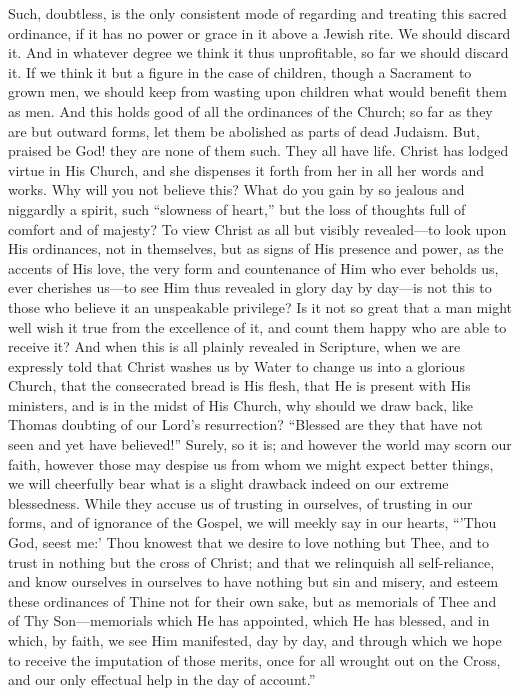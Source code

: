 Such, doubtless, is the only consistent mode of regarding and
treating this sacred ordinance, if it has no power or grace in it
above a Jewish rite. We should discard it. And in whatever degree we
think it thus unprofitable, so far we should discard it. If we think
it but a figure in the case of children, though a Sacrament to grown
men, we should keep from wasting upon children what would benefit them
as men. And this holds good of all the ordinances of the Church; so
far as they are but outward forms, let them be abolished as parts of
dead Judaism. But, praised be God! they are none of them such. They
all have life. Christ has lodged virtue in His Church, and she
dispenses it forth from her in all her words and works. Why will you
not believe this? What do you gain by so jealous and niggardly a
spirit, such ``slowness of heart,'' but the loss of thoughts
full of comfort and of majesty? To view Christ as all but visibly
revealed—to look upon His ordinances, not in themselves, but as
signs of His presence and power, as the accents of His love, the very
form and countenance of Him who ever beholds us, ever cherishes us—to
see Him thus revealed in glory day by day—is not this to those who
believe it an unspeakable privilege? Is it not so great that a man
might well wish it true from the excellence of it, and count them
happy who are able to receive it? And when this is all plainly
revealed in Scripture, when we are expressly told that Christ washes
us by Water to change us into a glorious Church, that the consecrated
bread is His flesh, that He is present with His ministers, and is in
the midst of His Church, why should we draw back, like Thomas doubting
of our Lord's resurrection? ``Blessed are they that have not
seen and yet have believed!'' Surely, so it is; and however the
world may scorn our faith, however those may despise us from whom we
might expect better things, we will cheerfully bear what is a slight
drawback indeed on our extreme blessedness. While they accuse us of
trusting in ourselves, of trusting in our forms, and of ignorance of
the Gospel, we will meekly say in our hearts, ``'Thou God, seest
me:' Thou knowest that we desire to love nothing but Thee, and to
trust in nothing but the cross of Christ; and that we relinquish all
self-reliance, and know ourselves in ourselves to have nothing but sin
and misery, and esteem these ordinances of Thine not for their own
sake, but as memorials of Thee and of Thy Son—memorials which He has
appointed, which He has blessed, and in which, by faith, we see Him
manifested, day by day, and through which we hope to receive the
imputation of those merits, once for all wrought out on the Cross, and
our only effectual help in the day of account.''

